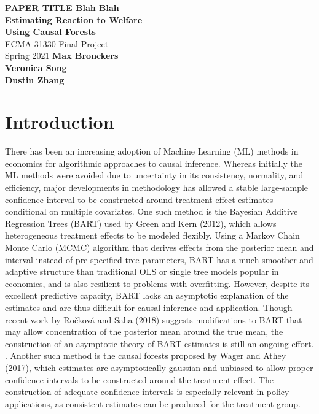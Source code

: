 \documentclass[12pt]{article}
\begin{document}
\begin{titlepage}
    \begin{center}
        \vspace*{1cm}
        \LARGE
        \textbf{PAPER TITLE Blah Blah\\ Estimating Reaction to Welfare\\ Using Causal Forests\\}
        \vspace{0.5cm}
        \Large
        ECMA 31330 Final Project \\ 
        \vspace{0.8cm}
        \large
        Spring 2021
        \vfill
        \vspace{5cm}
        \textbf{Max Bronckers \\ Veronica Song \\ Dustin Zhang}
    \end{center}
\end{titlepage}


\section{Introduction} 
There has been an increasing adoption of Machine Learning (ML) methods in economics for algorithmic approaches to causal inference. Whereas initially the ML methods were avoided due to uncertainty in its consistency, normality, and efficiency, major developments in methodology has allowed a stable large-sample confidence interval to be constructed around treatment effect estimates conditional on multiple covariates.\cite{athey2019ML} 
One such method is the Bayesian Additive Regression Trees (BART) used by Green and Kern (2012), which allows heterogeneous treatment effects to be modeled flexibly. Using a Markov Chain Monte Carlo (MCMC) algorithm that derives effects from the posterior mean and interval instead of pre-specified tree parameters, BART has a much smoother and adaptive structure than traditional OLS or single tree models popular in economics, and is also resilient to problems with overfitting.\cite{greenkern2012} However, despite its excellent predictive capacity, BART lacks an asymptotic explanation of the estimates and are thus difficult for causal inference and application. Though recent work by Ročková and Saha (2018) suggests modifications to BART that may allow concentration of the posterior mean around the true mean, the construction of an asymptotic theory of BART estimates is still an ongoing effort. \cite{rockova2018theory}. Another such method is the causal forests proposed by Wager and Athey (2017), which estimates are asymptotically gaussian and unbiased to allow proper confidence intervals to be constructed around the treatment effect. The construction of adequate confidence intervals is especially relevant in policy applications, as consistent estimates can be produced for the treatment group.\cite{atheywager2019} \\ 
\end{document}
